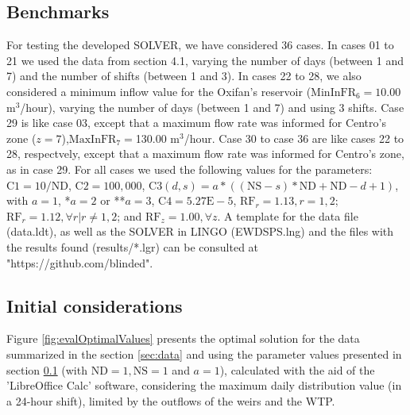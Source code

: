 \documentclass{singlecol}
\theoremstyle{TH}{
\newtheorem{lemma}{Lemma}
\newtheorem{theorem}[lemma]{Theorem}
\newtheorem{corrolary}[lemma]{Corrolary}
\newtheorem{conjecture}[lemma]{Conjecture}
\newtheorem{proposition}[lemma]{Proposition}
\newtheorem{claim}[lemma]{Claim}
\newtheorem{stheorem}[lemma]{Wrong Theorem}
\newtheorem{algorithm}{Algorithm}
}
\theoremstyle{THrm}{
\newtheorem{definition}{Definition}[section]
\newtheorem{question}{Question}[section]
\newtheorem{remark}{Remark}
\newtheorem{scheme}{Scheme}
}
\theoremstyle{THhit}{
\newtheorem{case}{Case}[section]
}
\begin{document}
\subsection{Benchmarks}
\label{sec:benchmarks}

For testing the developed SOLVER, we have considered 36 cases. In cases 01 to 21 we used the data from section 4.1, varying the number of days (between 1 and 7) and the number of shifts (between 1 and 3). In cases 22 to 28, we also considered a minimum inflow value for the Oxifan's reservoir ($\mathrm{MinInFR}_6 = 10.00$ m$^3$/hour), varying the number of days (between 1 and 7) and using 3 shifts. Case 29 is like case 03, except that a maximum flow rate was informed for Centro's zone ($z = 7$),$\mathrm{MaxInFR}_7 = $130.00 $\mathrm{m^3}$/hour. Case 30 to case 36 are like cases 22 to 28, respectvely, except that a maximum flow rate was informed for Centro's zone, as in case 29. For all cases we used the following values for the parameters: $\mathrm{C1}= 10/\mathrm{ND}$, $\mathrm{C2}= 100,000$, $\mathrm{C3}(d,s)=a*((\mathrm{NS}-s)*\mathrm{ND} + \mathrm{ND} - d + 1)$, with $a=1$, *$a=2$ or **$a=3$, $\mathrm{C4} = 5.27\mathrm{E-}5$, $\mathrm{RF}_r = 1.13, r=1,2$;  $\mathrm{RF}_r = 1.12,  \forall r | r \neq 1,2$; and $\mathrm{RF}_z =1.00, \forall z$. A template for the data file (data.ldt), as well as the SOLVER in LINGO (EWDSPS.lng) and the files with the results found (results/*.lgr) can be consulted at "https://github.com/blinded".

\subsection{Initial considerations}
\label{sec:initialConsiderations}

Figure \ref{fig:evalOptimalValues} presents the optimal solution for the data summarized in the section \ref{sec:data} and using the parameter values presented in section \ref{sec:benchmarks} (with $\mathrm{ND}=1, \mathrm{NS}=1$ and $a=1$), calculated with the aid of the 'LibreOffice Calc' software, considering the maximum daily distribution value (in a 24-hour shift), limited by the outflows of the weirs and the WTP.
\end{document}
